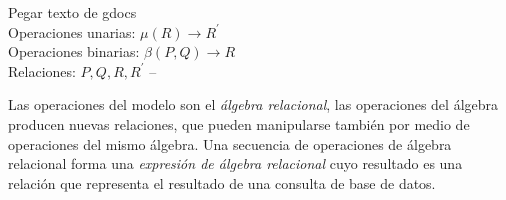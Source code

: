 Pegar texto de gdocs\\
Operaciones unarias: $\mu(R) \rightarrow R^\prime$\\
Operaciones binarias: $\beta(P,Q) \rightarrow R$\\
Relaciones: $P,Q,R,R^\prime$
--


Las operaciones del modelo son el \emph{álgebra relacional}, las operaciones del álgebra producen nuevas relaciones, que pueden manipularse también por medio de operaciones del mismo álgebra. Una secuencia de operaciones de álgebra relacional forma una \emph{expresión de álgebra relacional} cuyo resultado es una relación que representa el resultado de una consulta de base de datos.